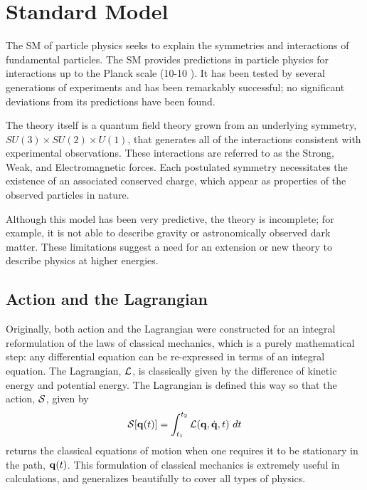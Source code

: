 \chapter{Standard Model}

\label{ch:standardmodel}

The \ac{SM} of particle physics seeks to explain the symmetries and interactions of fundamental particles. 
The \ac{SM} provides predictions in particle physics for interactions up to the Planck scale (10-10 \GeV).
It has been tested by several generations of experiments and has been remarkably successful; no significant deviations from its predictions have been found.

The theory itself is a quantum field theory grown from an underlying symmetry, $SU(3) \times SU(2) \times U(1)$, that generates all of the interactions consistent with experimental observations.
These interactions are referred to as the Strong, Weak, and Electromagnetic forces.
Each postulated symmetry necessitates the existence of an associated conserved charge, which appear as properties of the observed particles in nature. 

Although this model has been very predictive, the theory is incomplete; for example, it is not able to describe gravity or astronomically observed dark matter. 
These limitations suggest a need for an extension or new theory to describe physics at higher energies.

%
\section{Action and the Lagrangian}

Originally, both action and the Lagrangian were constructed for an integral reformulation of the laws of classical mechanics, which is a purely mathematical step: any differential equation can be re-expressed in terms of an integral equation. 
The Lagrangian, $\mathcal{L}$, is classically given by the difference of  kinetic energy and potential energy. 
The Lagrangian is defined this way so that the action, $\mathcal{S}$, given by 
\begin{equation}\label{eq:action}
 \mS[\vect{q}(t)] = \int_{t_1}^{t_2} \mL(\vect{q},\dot{\vect{q}},t)\ dt
\end{equation}
\noindent returns the classical equations of motion when one requires it to be stationary in the path, $\mathbf{q}(t)$. 
This formulation of classical mechanics is extremely useful in calculations, and generalizes beautifully to cover all types of physics.

